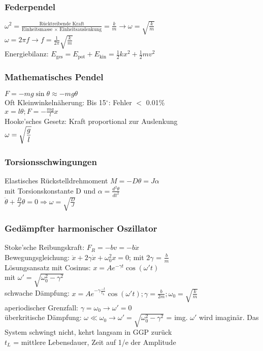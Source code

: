 \documentclass[fs, footer]{latex4ei}
\begin{document}
\begin{multicols*}{4}
\subsubsection{Federpendel}
$\omega ^2 = \frac{\text{Rücktreibende Kraft}}{\text{Einheitsmasse $\times$ Einheitsauslenkung}} = \frac{k}{m} \rightarrow \omega = \sqrt{\frac{k}{m}}$\\
$\omega= 2 \pi f \rightarrow f = \frac{1}{2\pi}\sqrt{\frac{k}{m}}$\\
Energiebilanz: $E_{\text{ges}} = E_{\text{pot}} + E_{\text{kin}} = \frac{1}{2}kx^2+\frac{1}{2}mv^2$\\
\subsubsection{Mathematisches Pendel} 
$F = -mg \sin \theta \approx -mg \theta$\\
Oft Kleinwinkelnäherung: Bis 15$^{\circ}$: Fehler $<$ 0.01\%\\ %
$x = l\theta ; F=-\frac{mg}{l}x$\\
Hooke'sches Gesetz: Kraft proportional zur Auslenkung\\
$\omega = \sqrt{\dfrac{g}{l}}$
\subsubsection{Torsionsschwingungen}
Elastisches Rückstelldrehmoment $M = -D\theta = J\alpha$\\
mit Torsionskonstante D und $\alpha = \frac{d^2 \theta}{dt^2}$\\
$\ddot{\theta}+\frac{D}{J}\theta = 0 \Rightarrow \omega = \sqrt{\frac{D}{J}}$\\
\subsubsection{Gedämpfter harmonischer Oszillator}
Stoke'sche Reibungskraft: $F_R = -bv = -b\dot{x}$\\
Bewegungsgleichung: $\ddot{x} + 2\gamma \dot{x} + \omega_0^2x = 0$; mit 2$\gamma$ = $\frac{b}{m}$\\
Lösungsansatz mit Cosinus: $x = Ae^{-\gamma t} \cos(\omega 't)$ \\mit $\omega ' = \sqrt{\omega_0^2-\gamma^2}$\\
schwache Dämpfung: $x = Ae^{-\gamma \frac{-t}{t_L}} \cos(\omega 't); \gamma = \frac{b}{2m}; \omega_0 = \sqrt{\frac{k}{m}}$\\
aperiodischer Grenzfall: $\gamma = \omega_0 \rightarrow	\omega' = 0$\\
überkritische Dämpfung: $\omega \ll \omega_0 \rightarrow \omega' = \sqrt{\omega_0^2 - \gamma^2}$ = img. $\omega'$ wird imaginär. Das System schwingt nicht, kehrt langsam in GGP zurück\\ 
$t_L$ = mittlere Lebensdauer, Zeit auf 1/e der Amplitude\\


\end{multicols*}
\end{document}
